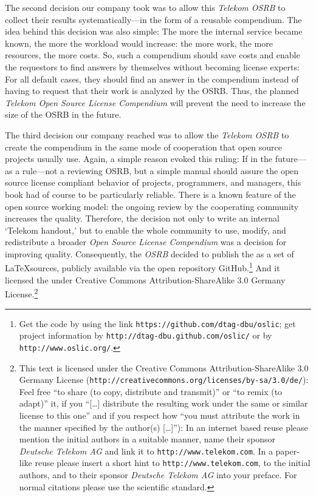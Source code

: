 The second decision our company took was to allow this \emph{Telekom OSRB} to
collect their results systematically---in the form of a reusable compendium.
The idea behind this decision was also simple: The more the internal service
became known, the more the workload would increase: the more work, the more
resources, the more costs. So, such a compendium should save costs and enable
the requestors to find answers by themselves without becoming license experts:
For all default cases, they should find an answer in the compendium instead of
having to request that their work is analyzed by the OSRB. Thus, the planned
\emph{Telekom Open Source License Compendium} will prevent the need
to increase the size of the OSRB in the future.

The third decision our company reached was to allow the \emph{Telekom OSRB} to
create the compendium in the same mode of cooperation that open source projects
usually use. Again, a simple reason evoked this ruling: If in the future---as a
rule---not a reviewing OSRB, but a simple manual should assure the open 
source license compliant behavior of projects, programmers, and managers, this
book had of course to be particularly reliable. There is a known feature of the
open source working model: the ongoing review by the cooperating community
increases the quality. Therefore, the decision not only to write an internal
`Telekom handout,' but to enable the whole community to use, modify, and 
redistribute a broader \emph{Open Source License Compendium} was a decision for
improving quality. Consequently, the \emph{OSRB} decided to publish the
\emph{\oslic} as a set of \LaTeX sources, publicly available via the open
repository GitHub.\footnote{Get the code by using the link
\texttt{https://github.com/dtag-dbu/oslic}; get project information by
\texttt{http://dtag-dbu.github.com/oslic/} or by
\texttt{http://www.oslic.org/}.}  And it licensed the \oslic{} under Creative
Commons Attribution-ShareAlike 3.0 Germany License.\footnote{This text is
licensed under the Creative Commons Attribution-ShareAlike 3.0 Germany License
(\texttt{http://creativecommons.org/licenses/by-sa/3.0/de/}): Feel free
\enquote{to share (to copy, distribute and transmit)} or \enquote{to remix (to
adapt)} it, if you \enquote{[\ldots] distribute the resulting work under the
same or similar license to this one} and if you respect how \enquote{you must
attribute the work in the manner specified by the author(s) [\ldots]}):
In an internet based reuse please mention the initial authors in a suitable
manner, name their sponsor \textit{Deutsche Telekom AG} and link it to
\texttt{http://www.telekom.com}. In a paper-like reuse please insert a short
hint to \texttt{http://www.telekom.com}, to the initial authors, and to their
sponsor \textit{Deutsche Telekom AG} into your preface. For normal citations
please use the scientific standard.}

